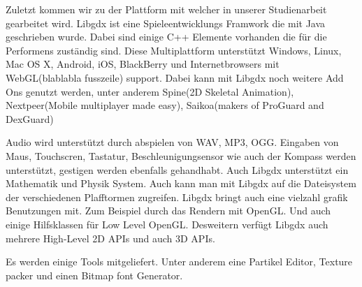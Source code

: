 Zuletzt kommen wir zu der Plattform mit welcher in unserer Studienarbeit gearbeitet wird.
Libgdx ist eine Spieleentwicklungs Framwork die mit Java geschrieben wurde. Dabei sind einige C++ Elemente
vorhanden die für die Performens zuständig sind. Diese Multiplattform unterstützt Windows, Linux, Mac OS X,
Android, iOS, BlackBerry und Internetbrowsers mit WebGL(blablabla fusszeile) support. 
Dabei kann mit Libgdx noch weitere Add Ons genutzt werden, unter anderem Spine(2D Skeletal Animation),
Nextpeer(Mobile multiplayer made easy), Saikoa(makers of ProGuard and DexGuard)

Audio wird unterstützt durch abspielen von WAV, MP3, OGG. Eingaben von Maus, Touchscren, Tastatur,
Beschleunigungsensor wie auch der Kompass werden unterstützt, gestigen werden ebenfalls gehandhabt.
Auch Libgdx unterstützt ein Mathematik und Physik System. Auch kann man mit Libgdx auf die Dateisystem der
verschiedenen Plafftormen zugreifen.
Libgdx bringt auch eine vielzahl grafik Benutzungen mit. Zum Beispiel durch das Rendern mit OpenGL.
Und auch einige Hilfsklassen für Low Level OpenGL. Desweitern verfügt Libgdx auch mehrere High-Level
2D APIs und auch 3D APIs.

Es werden einige Tools mitgeliefert. Unter anderem eine Partikel Editor, Texture packer und einen Bitmap
font Generator.